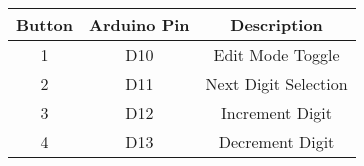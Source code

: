 \centering
\begin{tabular}{|c|c|c|}
\hline
Button & Arduino Pin & Description\\
\hline
1 & D10 & Edit Mode Toggle\\
\hline
2 & D11 & Next Digit Selection\\
\hline
3 & D12  & Increment Digit\\
\hline
4 & D13  & Decrement Digit\\
\hline

\end{tabular}
